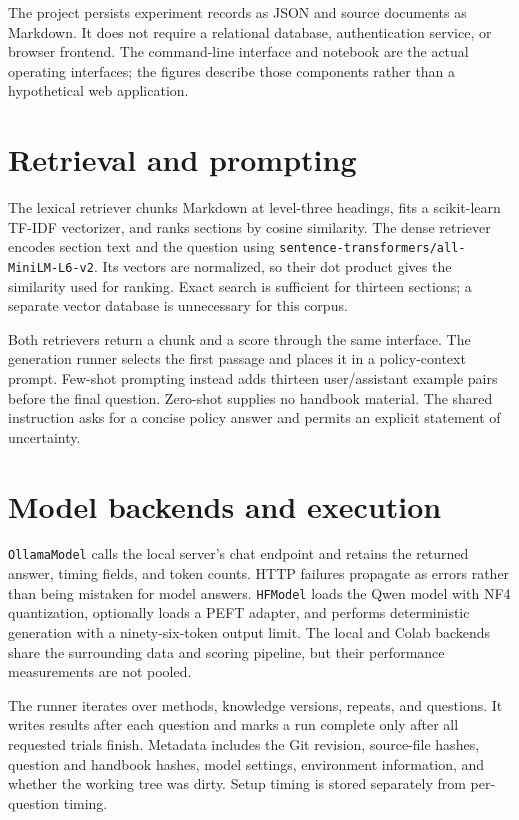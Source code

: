 \documentclass[11pt,letterpaper,oneside]{report}
\begin{document}
The project persists experiment records as JSON and source documents as Markdown. It does not require a relational database, authentication service, or browser frontend. The command-line interface and notebook are the actual operating interfaces; the figures describe those components rather than a hypothetical web application.

\section{Retrieval and prompting}
The lexical retriever chunks Markdown at level-three headings, fits a scikit-learn TF-IDF vectorizer, and ranks sections by cosine similarity. The dense retriever encodes section text and the question using \texttt{sentence-transformers/all-MiniLM-L6-v2}. Its vectors are normalized, so their dot product gives the similarity used for ranking. Exact search is sufficient for thirteen sections; a separate vector database is unnecessary for this corpus.

Both retrievers return a chunk and a score through the same interface. The generation runner selects the first passage and places it in a policy-context prompt. Few-shot prompting instead adds thirteen user/assistant example pairs before the final question. Zero-shot supplies no handbook material. The shared instruction asks for a concise policy answer and permits an explicit statement of uncertainty.

\section{Model backends and execution}
\texttt{OllamaModel} calls the local server's chat endpoint and retains the returned answer, timing fields, and token counts. HTTP failures propagate as errors rather than being mistaken for model answers. \texttt{HFModel} loads the Qwen model with NF4 quantization, optionally loads a PEFT adapter, and performs deterministic generation with a ninety-six-token output limit. The local and Colab backends share the surrounding data and scoring pipeline, but their performance measurements are not pooled.

The runner iterates over methods, knowledge versions, repeats, and questions. It writes results after each question and marks a run complete only after all requested trials finish. Metadata includes the Git revision, source-file hashes, question and handbook hashes, model settings, environment information, and whether the working tree was dirty. Setup timing is stored separately from per-question timing.
\end{document}

